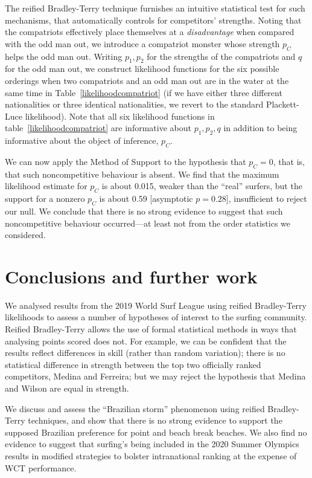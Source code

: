\documentclass{article}
\begin{document}
The reified Bradley-Terry technique furnishes an intuitive statistical
test for such mechanisms, that automatically controls for competitors'
strengths.  Noting
that the compatriots effectively place themselves at a {\em
  disadvantage} when compared with the odd man out, we introduce a
compatriot monster whose strength $p_C$ helps the odd man out.
Writing $p_1, p_2$ for the strengths of the compatriots and $q$ for
the odd man out, we construct likelihood functions for the six
possible orderings when two compatriots and an odd man out are in the
water at the same time in Table~\ref{likelihoodcompatriot} (if we have
either three different nationalities or three identical nationalities,
we revert to the standard Plackett-Luce likelihood).  Note that all
six likelihood functions in table~\ref{likelihoodcompatriot} are
informative about $p_1,p_2,q$ in addition to being informative about
the object of inference, $p_C$.

We can now apply the Method of Support to the hypothesis that $p_C=0$,
that is, that such noncompetitive behaviour is absent.  We find that
the maximum likelihood estimate for $p_C$ is about 0.015, weaker than
the ``real'' surfers, but the support for a nonzero $p_C$ is about
0.59 [asymptotic $p=0.28$], insufficient to reject our null.  We
conclude that there is no strong evidence to suggest that such
noncompetitive behaviour occurred---at least not from the order
statistics we considered.

\section{Conclusions and further work}

We analysed results from the 2019 World Surf League using reified
Bradley-Terry likelihoods to assess a number of hypotheses of interest
to the surfing community.  Reified Bradley-Terry allows the use of
formal statistical methods in ways that analysing points scored does
not.  For example, we can be confident that the results reflect
differences in skill (rather than random variation); there is no
statistical difference in strength between the top two officially
ranked competitors, Medina and Ferreira; but we may reject the
hypothesis that Medina and Wilson are equal in strength.

We discuss and assess the ``Brazilian storm'' phenomenon using reified
Bradley-Terry techniques, and show that there is no strong evidence to
support the supposed Brazilian preference for point and beach break
beaches.  We also find no evidence to suggest that surfing's being
included in the 2020 Summer Olympics results in modified strategies to
bolster intranational ranking at the expense of WCT performance.
\end{document}
